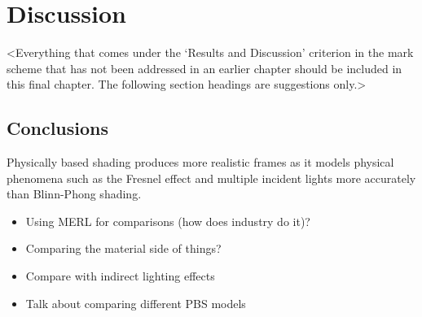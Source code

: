 \chapter{Discussion}
\label{chapter4}

<Everything that comes under the `Results and Discussion' criterion in the mark scheme that has not been addressed in an earlier chapter should be included in this final chapter. The following section headings are suggestions only.>

\section{Conclusions}
\lipsum[13]


Physically based shading produces more realistic frames as it models physical phenomena such as the Fresnel effect and multiple incident lights more accurately than Blinn-Phong shading.

\begin{itemize}
	\item Using MERL for comparisons (how does industry do it)?
	\item Comparing the material side of things?
	\item Compare with indirect lighting effects
	\item Talk about comparing different PBS models
\end{itemize}

